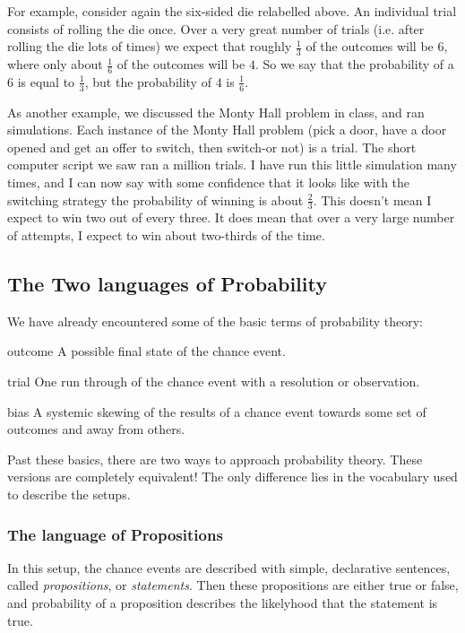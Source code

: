 \documentclass[12pt,letterpaper]{article}
\theoremstyle{definition}
\begin{document}
For example, consider again the six-sided die relabelled above.
An individual trial consists of rolling the die once.
Over a very great number of trials (i.e. after rolling the die lots of times) we expect that roughly $\frac{1}{3}$ of the outcomes will be $6$, where only about $\frac{1}{6}$ of the outcomes will be $4$.
So we say that the probability of a $6$ is equal to $\frac{1}{3}$, but the probability of $4$ is $\frac{1}{6}$.

As another example, we discussed the Monty Hall problem in class, and ran simulations.
Each instance of the Monty Hall problem (pick a door, have a door opened and get an offer to switch, then switch-or not) is a trial.
The short computer script we saw ran a million trials.
I have run this little simulation many times, and I can now say with some confidence that it looks like with the switching strategy the probability of winning is about $\frac{2}{3}$. 
This doesn't mean I expect to win two out of every three.
It does mean that over a very large number of attempts, I expect to win about two-thirds of the time.

\subsection*{The Two languages of Probability}

We have already encountered some of the basic terms of probability theory:
\begin{compactdesc}
\item[outcome] A possible final state of the chance event.
\item[trial] One run through of the chance event with a resolution or observation.
\item[bias] A systemic skewing of the results of a chance event towards some set of outcomes and away from others.
\end{compactdesc}

Past these basics, there are two ways to approach probability theory.
These versions are completely equivalent!
The only difference lies in the vocabulary used to describe the setups.

\subsubsection*{The language of Propositions}

In this setup, the chance events are described with simple, declarative sentences, called \emph{propositions}, or \emph{statements}.
Then these propositions are either true or false, and probability of a proposition describes the likelyhood that the statement is true.
\end{document}
